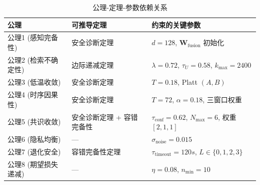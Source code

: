 \documentclass[11pt,a4paper]{ctexart}
\theoremstyle{remark}
\begin{document}
\begin{table}[H]
\centering
\small
\begin{tabular}{lll}
\toprule
\textbf{公理} & \textbf{可推导定理} & \textbf{约束的关键参数} \\
\midrule
公理1 (感知完备性) & 安全诊断定理 & $d=128$, $\mathbf{W}_{\text{fusion}}$ 初始化 \\
公理2 (检索不确定性) & 边际递减定理 & $\lambda=0.72$, $\tau_U=0.58$, $k_{\max}=2400$ \\
公理3 (低温收敛) & 安全诊断定理 & $T=0.18$, Platt $(A,B)$ \\
公理4 (时序因果性) & 安全诊断定理 & $T=72$, $\alpha=0.18$, 三窗口权重 \\
公理5 (共识收敛) & 安全诊断定理 + 容错完备性 & $\tau_{\text{conf}}=0.62$, $N_{\max}=6$, 权重 $[2,1,1]$ \\
公理6 (隐私均衡) & — & $\sigma_{\text{noise}}=0.015$ \\
公理7 (退化安全) & 容错完备性定理 & $\tau_{\text{timeout}}=120s$, $L \in \{0,1,2,3\}$ \\
公理8 (期望损失递减) & — & $\eta=0.08$, $n_{\min}=10$ \\
\bottomrule
\end{tabular}
\caption{公理-定理-参数依赖关系}
\end{table}
\end{document}
